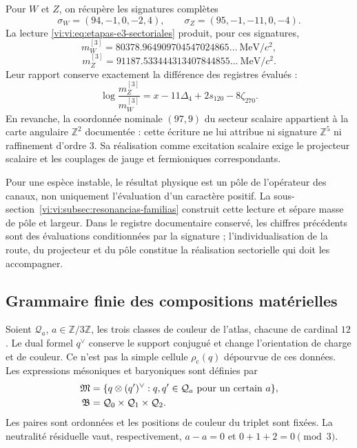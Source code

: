 Pour \(W\) et \(Z\), on récupère les signatures complètes
\[
 \sigma_W=(94,-1,0,-2,4),\qquad
 \sigma_Z=(95,-1,-11,0,-4).
\]
La lecture \eqref{vi:vi:eq:etapas-e3-sectoriales} produit, pour ces signatures,
\[
 m_W^{[3]}=80378.964909704547024865\ldots\ \mathrm{MeV}/c^2,
\]
\[
 m_Z^{[3]}=91187.533444313407844855\ldots\ \mathrm{MeV}/c^2.
\]
Leur rapport conserve exactement la différence des registres évalués :
\[
 \log\frac{m_Z^{[3]}}{m_W^{[3]}}
 =x-11\Delta_4+2s_{120}-8\zeta_{270}.
\]
En revanche, la coordonnée nominale \((97,9)\) du secteur scalaire appartient
à la carte angulaire \(\mathbb Z^2\) documentée : cette écriture ne lui attribue
ni signature \(\mathbb Z^5\) ni raffinement d'ordre
\(3\). Sa réalisation comme excitation scalaire exige le projecteur
scalaire et les couplages de jauge et fermioniques correspondants.

Pour une espèce instable, le résultat physique est un pôle de l’opérateur
des canaux, non uniquement l’évaluation d’un caractère positif. La
sous-section~\ref{vi:vi:subsec:resonancias-familias} construit cette lecture et
sépare masse de pôle et largeur. Dans le registre documentaire conservé,
les chiffres précédents sont des évaluations conditionnées par la signature ;
l’individualisation de la route, du projecteur et du pôle constitue la réalisation
sectorielle qui doit les accompagner.

\subsection{Grammaire finie des compositions matérielles}
\label{vi:vi:subsec:gramatica-compuestos}

Soient \(\mathcal Q_a\), \(a\in\mathbb Z/3\mathbb Z\), les trois
classes de couleur de l’atlas, chacune de cardinal \(12\). Le dual formel
\(q^\vee\) conserve le support conjugué et change l’orientation de
charge et de couleur. Ce n’est pas la simple cellule \(\rho_{\mathrm c}(q)\) dépourvue
de ces données. Les expressions mésoniques et baryoniques sont définies par
\begin{align}
 \mathfrak M&=\{q\otimes(q')^\vee:
 q,q'\in\mathcal Q_a\text{ pour un certain }a\},\notag\\
 \mathfrak B&=\mathcal Q_0\times\mathcal Q_1\times\mathcal Q_2.
 \label{vi:vi:eq:gramatica-meson-barion}
\end{align}
Les paires sont ordonnées et les positions de couleur du triplet sont
fixées. La neutralité résiduelle vaut, respectivement,
\(a-a=0\) et \(0+1+2=0\pmod3\).

